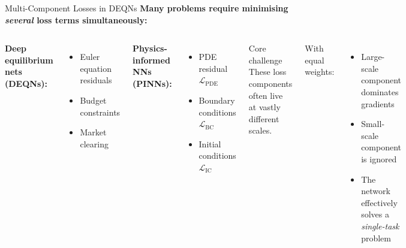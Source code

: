 \documentclass[aspectratio=169,11pt]{beamer}
\newcommand{\emphc}[1]{\textcolor{harvardcrimson}{#1}}
\begin{document}

\begin{frame}{Multi-Component Losses in DEQNs}
\textbf{Many problems require minimising \emph{several} loss terms simultaneously:}

\vspace{0.3cm}
\begin{columns}[T]
\textbf{Deep equilibrium nets (DEQNs):}
\begin{itemize}
    \item Euler equation residuals
    \item Budget constraints
    \item Market clearing
\end{itemize}

\vspace{0.3cm}
\textbf{Physics-informed NNs (PINNs):}
\begin{itemize}
    \item PDE residual $\mathcal{L}_\text{PDE}$
    \item Boundary conditions $\mathcal{L}_\text{BC}$
    \item Initial conditions $\mathcal{L}_\text{IC}$
\end{itemize}

\begin{alertblock}{Core challenge}
These loss components often live at \emphc{vastly different scales}.
\end{alertblock}

\vspace{0.3cm}
With equal weights:
\begin{itemize}
    \item Large-scale component dominates gradients
    \item Small-scale component is \emphc{ignored}
    \item The network effectively solves a \emph{single-task} problem
\end{itemize}
\end{columns}
\end{frame}
\end{document}
